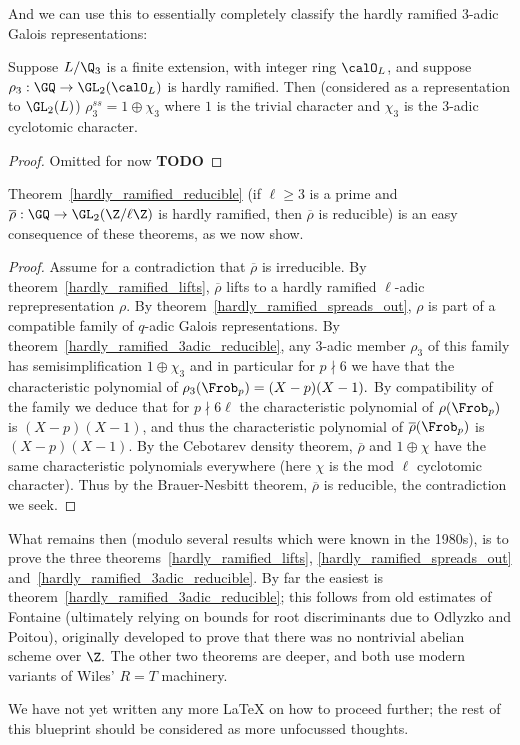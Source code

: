 And we can use this to essentially completely classify the hardly ramified 3-adic Galois
representations:

\begin{theorem}
  \label{hardly_ramified_3adic_reducible}
  \leanok
  Suppose $L/\Q_3$ is a finite extension, with integer ring $\calO_L$, and suppose
  $\rho_3:\GQ\to\GL_2(\calO_L)$ is hardly ramified. Then (considered as a representation
  to $\GL_2(L)$) $\rho_3^{ss}=1\oplus\chi_3$
  where $1$ is the trivial character and $\chi_3$ is the 3-adic cyclotomic character.
\end{theorem}
\begin{proof}
  Omitted for now {\bf TODO}
\end{proof}

Theorem~\ref{hardly_ramified_reducible} (if $\ell\geq 3$ is a prime and
$\overline{\rho}:\GQ\to\GL_2(\Z/\ell\Z)$ is hardly ramified,
then $\overline{\rho}$ is reducible) is an easy consequence of these theorems,
as we now show.

\begin{proof}
  Assume for a contradiction that $\overline{\rho}$ is irreducible. By theorem~\ref{hardly_ramified_lifts},
  $\overline{\rho}$ lifts to a hardly ramified $\ell$-adic reprepresentation $\rho$. By
  theorem~\ref{hardly_ramified_spreads_out}, $\rho$ is part of a compatible family of
  $q$-adic Galois representations. By theorem~\ref{hardly_ramified_3adic_reducible},
  any 3-adic member $\rho_3$ of this family has semisimplification $1\oplus\chi_3$ and in particular
  for $p\nmid 6$ we have that the characteristic polynomial of $\rho_3(\Frob_p)=(X-p)(X-1).$
  By compatibility of the family we deduce that for $p\nmid 6\ell$ the characteristic
  polynomial of $\rho(\Frob_p)$ is $(X-p)(X-1)$, and thus the characteristic polynomial
  of $\overline{\rho}(\Frob_p)$ is $(X-p)(X-1)$. By the Cebotarev density theorem,
  $\overline{\rho}$ and $1\oplus\chi$ have the same characteristic polynomials everywhere
  (here $\chi$ is the mod $\ell$ cyclotomic character). Thus by the Brauer-Nesbitt theorem,
  $\overline{\rho}$ is reducible, the contradiction we seek.
\end{proof}

What remains then (modulo several results which were known in the 1980s),
is to prove the three theorems~\ref{hardly_ramified_lifts},
\ref{hardly_ramified_spreads_out} and~\ref{hardly_ramified_3adic_reducible}.
By far the easiest is theorem~\ref{hardly_ramified_3adic_reducible}; this follows
from old estimates of Fontaine (ultimately relying on bounds for root discriminants due to
Odlyzko and Poitou), originally developed to prove that there was no
nontrivial abelian scheme over $\Z.$ The other two theorems are deeper, and both use
modern variants of Wiles' $R=T$ machinery.

We have not yet written any more LaTeX on how to proceed further; the rest of
this blueprint should be considered as more unfocussed thoughts.
